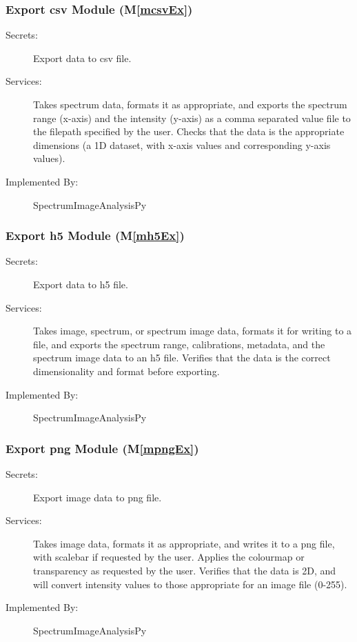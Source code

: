\documentclass[12pt, titlepage]{article}
\newcommand{\mref}[1]{M\ref{#1}}
\newcommand{\progname}{SpectrumImageAnalysisPy}
\begin{document}
\subsubsection{Export csv Module (\mref{mcsvEx})}
\label{sssec:ExportCSV}
\begin{description}
	\item[Secrets:]Export data to csv file.
	\item[Services:]Takes spectrum data, formats it as appropriate, and exports the
spectrum range (x-axis) and the intensity (y-axis) as a comma separated value
file to the filepath specified by the user. Checks that the data is the
appropriate dimensions (a 1D dataset, with x-axis values and corresponding
y-axis values).
	\item[Implemented By:] \progname
\end{description}

\subsubsection{Export h5 Module (\mref{mh5Ex})}
\label{sssec:ExportH5}
\begin{description}
	\item[Secrets:]Export data to h5 file.
	\item[Services:]Takes image, spectrum, or spectrum image data, formats it for
writing to a file, and exports the spectrum range, calibrations, metadata, and
the spectrum image data to an h5 file. Verifies that the data is the correct
dimensionality and format before exporting.
	\item[Implemented By:] \progname
\end{description}

\subsubsection{Export png Module (\mref{mpngEx})}
\label{sssec:ExportPNG}
\begin{description}
	\item[Secrets:]Export image data to png file.
	\item[Services:]Takes image data, formats it as appropriate, and writes it to a
png file, with scalebar if requested by the user. Applies the colourmap or
transparency as requested by the user. Verifies that the data is 2D, and will
convert intensity values to those appropriate for an image file (0-255).
	\item[Implemented By:] \progname
\end{description}
\end{document}
